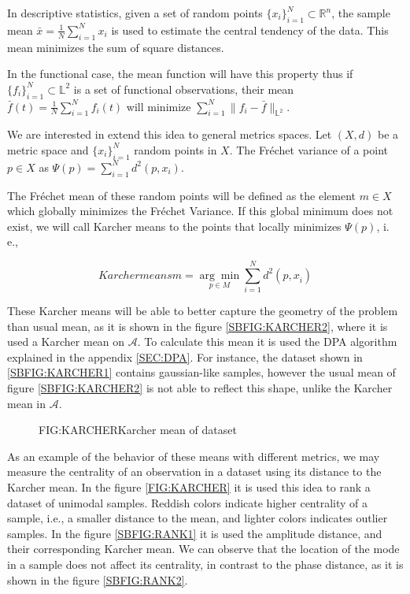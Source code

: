 In descriptive statistics, given a set of random points
$\{x_i\}_{i=1}^{N} \subset \mathbb{R}^n$, the sample mean
$\bar x = \frac{1}{N}\sum_{i=1}^{N} x_i$ is used to estimate the central
tendency of the data. This mean minimizes the sum of square distances.

In the functional case, the mean function will have this property thus if
$\{f_i\}_{i=1}^{N} \subset \mathbb{L}^2$ is a set of functional observations,
their mean $\bar f(t) = \frac{1}{N}\sum_{i=1}^{N} f_i(t)$ will minimize
$\sum_{i=1}^{N}\|f_i - \bar f\|_{\mathbb{L}^2}$.

We are interested in extend this idea to general metrics spaces.
Let $(X, d)$ be a metric space and $\{x_i\}_{i=1}^{N}$ random points in $X$.
The Fréchet variance of a point $p \in X$ as $\Psi(p)=\sum_{i=1}^{N} d^{2}\left(p, x_{i}\right)$.

The Fréchet mean of these random points will be defined as the element $m \in X$
which globally minimizes the Fréchet Variance. If this global minimum does not
exist, we will call Karcher means to the points that locally minimizes
$\Psi(p)$, i. e.,

\begin{equation}[]{Karcher means}
m=\underset{p \in M}{\arg \min } \sum_{i=1}^{N} d^{2}\left(p, x_{\dot{i}}\right)
\end{equation}

These Karcher means will be able to better capture the geometry of the problem
than usual mean, as it is shown in the figure \ref{SBFIG:KARCHER2}, where it is
used a Karcher mean on $\mathscr{A}$.
To calculate this mean it is used the DPA algorithm explained in the appendix \ref{SEC:DPA}.
For instance, the dataset shown in \ref{SBFIG:KARCHER1} contains gaussian-like
samples, however the usual mean of figure \ref{SBFIG:KARCHER2} is not able to reflect
this shape, unlike the Karcher mean in $\mathscr{A}$.

\begin{figure}[Karcher mean of dataset]{FIG:KARCHER}{Karcher mean of dataset}
	 \quad
	 \\
	 \quad
\end{figure}

As an example of the behavior of these means with different metrics, we may
measure the centrality of an observation in a dataset using its distance to the
Karcher mean. In the figure \ref{FIG:KARCHER} it is used this idea to rank a dataset of
unimodal samples. Reddish colors indicate higher centrality of a sample, i.e.,
a smaller distance to the mean, and lighter colors indicates outlier samples.
In the figure \ref{SBFIG:RANK1} it is used the amplitude distance, and their
corresponding Karcher mean. We can observe that the location of the mode in a
sample does not affect its centrality, in contrast to the phase distance,
as it is shown in the figure \ref{SBFIG:RANK2}.


